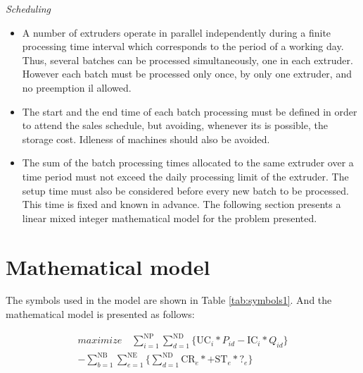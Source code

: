 \emph{Scheduling}

\begin{itemize}
\item A number of extruders operate in parallel independently during a finite processing time interval which corresponds to the period of a working day. Thus, several batches can be processed simultaneously, one in each extruder. However each batch must be processed only once, by only one extruder, and no preemption il allowed. 
\item The start and the end time of each batch processing must be defined in order to attend the sales schedule, but avoiding, whenever its is possible, the storage cost. Idleness of machines should also be avoided.
\item The sum of the batch processing times allocated to the same extruder over a time period must not exceed the daily processing limit of the extruder. The setup time must also be considered before every new batch to be processed. This time is fixed and known in advance. The following section presents a linear mixed integer mathematical model for the problem presented.
\end{itemize}

\section{Mathematical model}

The symbols used in the model are shown in Table \ref{tab:symbols1}. And the mathematical model is
presented as follows:

\begin{eqnarray} 
\label{eq:objFunc}
	 maximize \quad \nonumber
	 \sum_{i=1}^{\mathrm{NP}}{\sum_{d=1}^{\mathrm{ND}}\{\mathrm{UC}_i*P_{id} - \mathrm{IC}_i*Q_{id}}\}  \\ 
	 - \sum_{b=1}^{\mathrm{NB}}{\sum_{e=1}^{\mathrm{NE}}\{\sum_{d=1}^{\mathrm{ND}}{\mathrm{CR}_e* + \mathrm{ST}_e*\mathrm{?}_e}}\}
\end{eqnarray}

